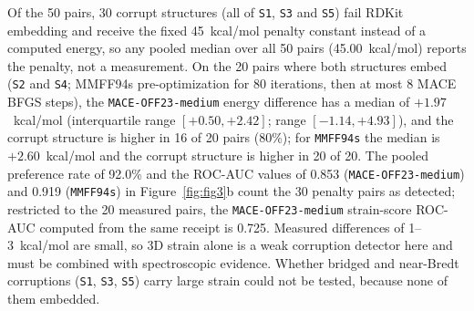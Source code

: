 \documentclass[10pt,twocolumn]{article}
\begin{document}
\begin{table}[t]
  \centering
  \caption{\textbf{Stratum breakdown of \texttt{MACE-OFF23-medium} BFGS 3D strain audit ($N=50$ pairs).} Medians in kcal/mol over pairs where both structures embed; ``---'' means no measured pair (all 10 corrupt structures fail embedding and carry the fixed 45~kcal/mol penalty). Win counts penalty pairs as wins; Node Outlier compares mean $\Omega_{\text{node}}$ (isolable / corrupt, kcal/mol).}
  \label{tab:strain_audit}
\end{table}

Of the 50 pairs, 30 corrupt structures (all of \texttt{S1}, \texttt{S3} and \texttt{S5}) fail RDKit embedding and receive the fixed 45~kcal/mol penalty constant instead of a computed energy, so any pooled median over all 50 pairs (45.00~kcal/mol) reports the penalty, not a measurement. On the 20 pairs where both structures embed (\texttt{S2} and \texttt{S4}; MMFF94s pre-optimization for 80 iterations, then at most 8 MACE BFGS steps), the \texttt{MACE-OFF23-medium} energy difference has a median of $+1.97$~kcal/mol (interquartile range $[+0.50, +2.42]$; range $[-1.14, +4.93]$), and the corrupt structure is higher in 16 of 20 pairs (80\%); for \texttt{MMFF94s} the median is $+2.60$~kcal/mol and the corrupt structure is higher in 20 of 20. The pooled preference rate of 92.0\% and the ROC-AUC values of 0.853 (\texttt{MACE-OFF23-medium}) and 0.919 (\texttt{MMFF94s}) in Figure~\ref{fig:fig3}b count the 30 penalty pairs as detected; restricted to the 20 measured pairs, the \texttt{MACE-OFF23-medium} strain-score ROC-AUC computed from the same receipt is 0.725. Measured differences of 1--3~kcal/mol are small, so 3D strain alone is a weak corruption detector here and must be combined with spectroscopic evidence. Whether bridged and near-Bredt corruptions (\texttt{S1}, \texttt{S3}, \texttt{S5}) carry large strain could not be tested, because none of them embedded.
\end{document}
